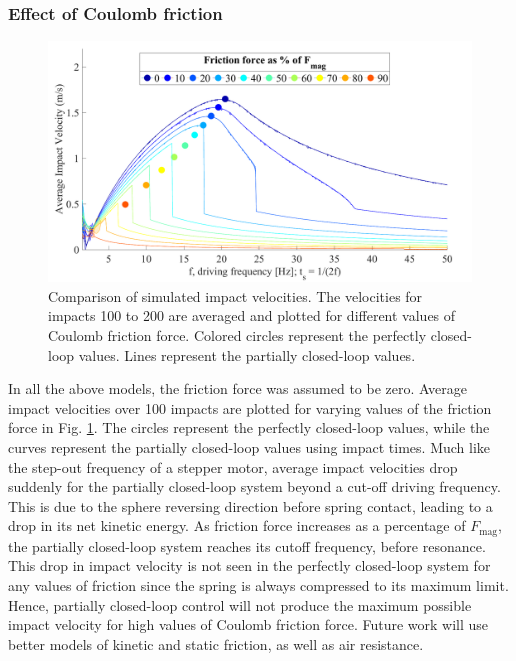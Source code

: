 \documentclass[letterpaper, 10 pt, conference]{ieeeconf}  %
\begin{document}
\subsubsection{Effect of Coulomb friction}
\label{frictionwriteup}
\begin{figure}
	\includegraphics[width=\linewidth]{FrictionForceWithClosedLoopValues.pdf}
		\caption[Effect of Coulomb friction on partially closed-loop control]{Comparison of  simulated impact velocities. The  velocities for impacts 100 to 200 are averaged and plotted for different values of Coulomb friction force. Colored circles represent the perfectly closed-loop values.  Lines represent the partially closed-loop values.}
	\label{friction}
	\vspace{-2em}
\end{figure}
In all the above models, the friction force was assumed to be zero. Average impact velocities over 100 impacts are plotted for varying values of the friction force in Fig. \ref{friction}. The circles represent the perfectly closed-loop values, while the curves represent the partially closed-loop values using impact times. Much like the step-out frequency of a stepper motor, average impact velocities drop suddenly for the partially closed-loop system beyond a cut-off driving frequency. This is due to the sphere reversing direction before spring contact, leading to a drop in its net kinetic energy. As friction force increases as a percentage of $F_{\textrm{mag}}$, the partially closed-loop system reaches its cutoff frequency, before resonance. This drop in impact velocity is not seen in the perfectly closed-loop system for any values of friction since the spring is always compressed to its maximum limit. Hence, partially closed-loop control will not produce the maximum possible impact velocity for high values of Coulomb friction force. Future work will use better models of kinetic and static friction, as well as air resistance.
\end{document}
